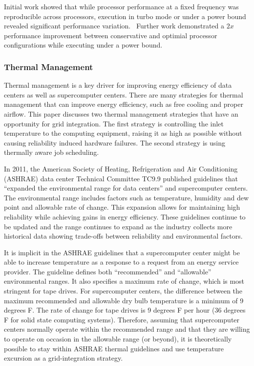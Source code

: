 Initial work showed that while processor performance at a fixed frequency 
was reproducible across processors, execution in turbo mode or under a power
bound revealed significant performance variation.~\cite{Rountree2012} Further
work demonstrated a $2x$ performance improvement between conservative and
optimial processor configurations while executing under a power bound.~\cite{Patki1}


\subsubsection{Thermal Management}

Thermal management is a key driver for improving energy efficiency of data
centers as well as supercomputer centers.  There are many strategies for thermal
management that can improve energy efficiency, such as free cooling and proper
airflow.  This paper discusses two thermal management strategies that have an
opportunity for grid integration.  The first strategy is controlling the inlet
temperature to the computing equipment, raising it as high as possible without
causing reliability induced hardware failures.  The second strategy is using
thermally aware job scheduling.

In 2011, the American Society of Heating, Refrigeration and Air Conditioning
(ASHRAE) data center Technical Committee TC9.9 published guidelines that
“expanded the environmental range for data centers” and supercomputer
centers. The environmental range includes factors such as temperature, humidity
and dew point and allowable rate of change.  This expansion allows for
maintaining high reliability while achieving gains in energy efficiency.  These
guidelines continue to be updated and the range continues to expand as the
industry collects more historical data showing trade-offs between reliability
and environmental factors.

It is implicit in the ASHRAE guidelines that a supercomputer center might be
able to increase temperature as a response to a request from an energy service
provider.  The guideline defines both “recommended” and
“allowable” environmental ranges.  It also specifies a maximum rate of
change, which is most stringent for tape drives.  For supercomputer centers, the
difference between the maximum recommended and allowable dry bulb temperature is
a minimum of 9 degrees F.  The rate of change for tape drives is 9 degrees F per
hour (36 degrees F for solid state computing systems).   Therefore, assuming
that supercomputer centers normally operate within the recommended range and
that they are willing to operate on occasion in the allowable range (or beyond),
it is theoretically possible to stay within ASHRAE thermal guidelines and use
temperature excursion as a grid-integration strategy.  

